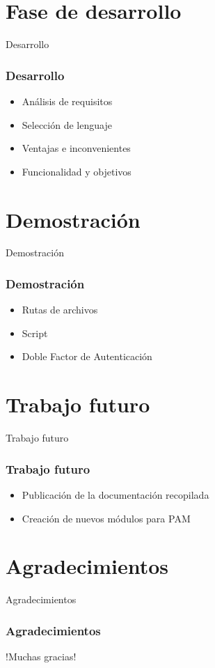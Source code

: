 \documentclass{beamer}
\begin{document}
\section{Fase de desarrollo}
\begin{frame}{Desarrollo}
	\frametitle{Desarrollo}
	\begin{itemize}
		\item Análisis de requisitos
		\item Selección de lenguaje
		\item Ventajas e inconvenientes
		\item Funcionalidad y objetivos
	\end{itemize}
\end{frame}
\section{Demostración}
\begin{frame}{Demostración}
	\frametitle{Demostración}
	\begin{itemize}
		\item Rutas de archivos
		\item Script
		\item Doble Factor de Autenticación
	\end{itemize}
\end{frame}
\section{Trabajo futuro}
\begin{frame}{Trabajo futuro}
	\frametitle{Trabajo futuro}
	\begin{itemize}
		\item Publicación de la documentación recopilada
		\item Creación de nuevos módulos para PAM
	\end{itemize}
\end{frame}
\section{Agradecimientos}
\begin{frame}{Agradecimientos}
	\frametitle{Agradecimientos}
	\begin{center}
	\huge !Muchas gracias!
	\end{center}
\end{frame}
\end{document}
